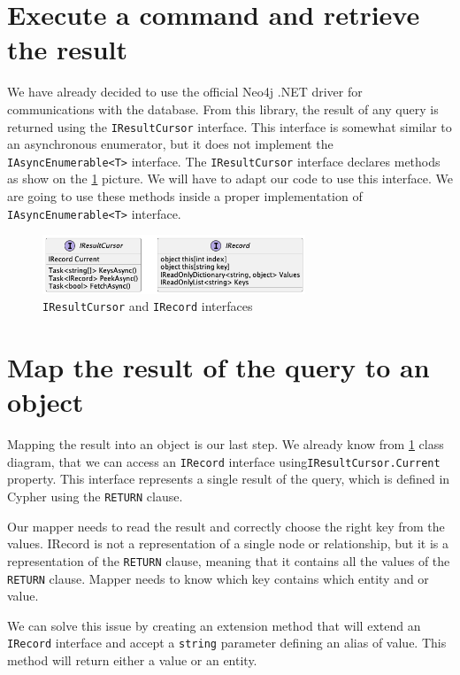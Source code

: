 \section{Execute a command and retrieve the result}

We have already decided to use the official Neo4j .NET driver for communications with the database.
From this library, the result of any query is returned using the \texttt{IResultCursor} interface.
This interface is somewhat similar to an asynchronous enumerator, but it does not implement the \texttt{IAsyncEnumerable<T>} interface.
The \texttt{IResultCursor} interface declares methods as show on the \ref{fig:iresinterface} picture. We will have to adapt our code to use this interface.
We are going to use these methods inside a proper implementation of \texttt{IAsyncEnumerable<T>} interface.

\begin{figure}[H]
	\centering
	\includegraphics[width=0.7\textwidth]{content/IResultCursor.png}
	\caption{\texttt{IResultCursor} and \texttt{IRecord} interfaces}
	\label{fig:iresinterface}
\end{figure}

\section{Map the result of the query to an object}

Mapping the result into an object is our last step.
We already know from \ref{fig:iresinterface} class diagram, that we can access an \texttt{IRecord} interface using\linebreak \texttt{IResultCursor.Current} property.
This interface represents a single result of the query, which is defined in Cypher using the \texttt{RETURN} clause.

Our mapper needs to read the result and correctly choose the right key from the values.
IRecord is not a representation of a single node or relationship, but it is a representation of the \texttt{RETURN} clause, meaning that it contains all the values of the \texttt{RETURN} clause.
Mapper needs to know which key contains which entity and or value.

We can solve this issue by creating an extension method that will extend an \texttt{IRecord} interface and accept a \texttt{string} parameter defining an alias of value.
This method will return either a value or an entity.

